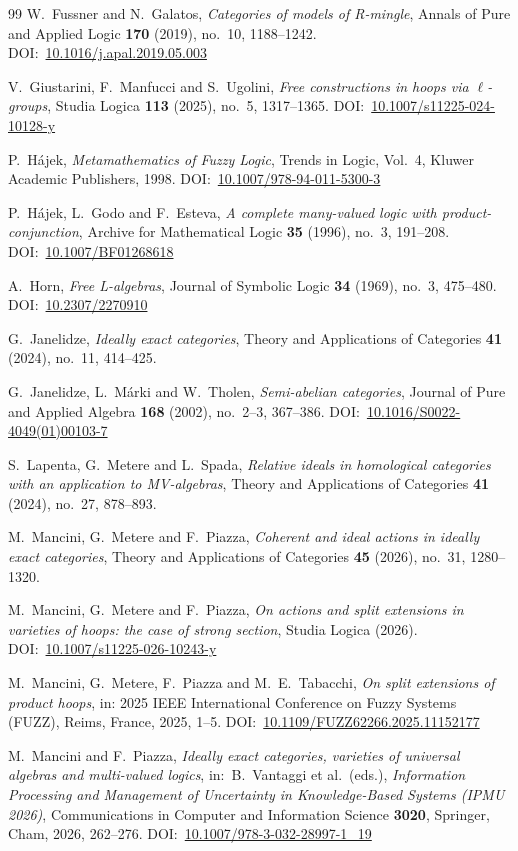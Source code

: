 \documentclass[reqno,a4paper]{amsart}
\renewcommand{\doi}[1]{DOI:~\href{https://doi.org/#1}{#1}}
\theoremstyle{plain}
\theoremstyle{definition}
\theoremstyle{remark}
\numberwithin{equation}{section}
\begin{document}
\begin{thebibliography}{99}
W.~Fussner and N.~Galatos, \emph{Categories of models of R-mingle}, Annals of Pure and Applied Logic \textbf{170} (2019), no.~10, 1188--1242. \doi{10.1016/j.apal.2019.05.003}

V.~Giustarini, F.~Manfucci and S.~Ugolini, \emph{Free constructions in hoops via $\ell$-groups}, Studia Logica \textbf{113} (2025), no.~5, 1317--1365. \doi{10.1007/s11225-024-10128-y}

P.~Hájek, \emph{Metamathematics of Fuzzy Logic}, Trends in Logic, Vol.~4, Kluwer Academic Publishers, 1998. \doi{10.1007/978-94-011-5300-3}

P.~Hájek, L.~Godo and F.~Esteva, \emph{A complete many-valued logic with product-conjunction}, Archive for Mathematical Logic \textbf{35} (1996), no.~3, 191--208. \doi{10.1007/BF01268618}

A.~Horn, \emph{Free L-algebras}, Journal of Symbolic Logic \textbf{34} (1969), no.~3, 475--480. \doi{10.2307/2270910}

G.~Janelidze, \emph{Ideally exact categories}, Theory and Applications of Categories \textbf{41} (2024), no.~11, 414--425.

G.~Janelidze, L.~Márki and W.~Tholen, \emph{Semi-abelian categories}, Journal of Pure and Applied Algebra \textbf{168} (2002), no.~2--3, 367--386. \doi{10.1016/S0022-4049(01)00103-7}

S.~Lapenta, G.~Metere and L.~Spada, \emph{Relative ideals in homological categories with an application to MV-algebras}, Theory and Applications of Categories \textbf{41} (2024), no.~27, 878--893.

M.~Mancini, G.~Metere and F.~Piazza, \emph{Coherent and ideal actions in ideally exact categories}, Theory and Applications of Categories \textbf{45} (2026), no.~31, 1280--1320.

M.~Mancini, G.~Metere and F.~Piazza, \emph{On actions and split extensions in varieties of hoops: the case of strong section}, Studia Logica (2026). \doi{10.1007/s11225-026-10243-y}

M.~Mancini, G.~Metere, F.~Piazza and M.~E.~Tabacchi, \emph{On split extensions of product hoops}, in: 2025 IEEE International Conference on Fuzzy Systems (FUZZ), Reims, France, 2025, 1--5. \doi{10.1109/FUZZ62266.2025.11152177}

M.~Mancini and F.~Piazza, \emph{Ideally exact categories, varieties of universal algebras and multi-valued logics}, in:~B.~Vantaggi et al.~(eds.), \emph{Information Processing and Management of Uncertainty in Knowledge-Based Systems (IPMU 2026)}, Communications in Computer and Information Science \textbf{3020}, Springer, Cham, 2026, 262--276. DOI:~\href{https://doi.org/10.1007/978-3-032-28997-1_19}{10.1007/978-3-032-28997-1\_19}

\end{thebibliography}

\vspace{1.5\baselineskip}
\end{document}
